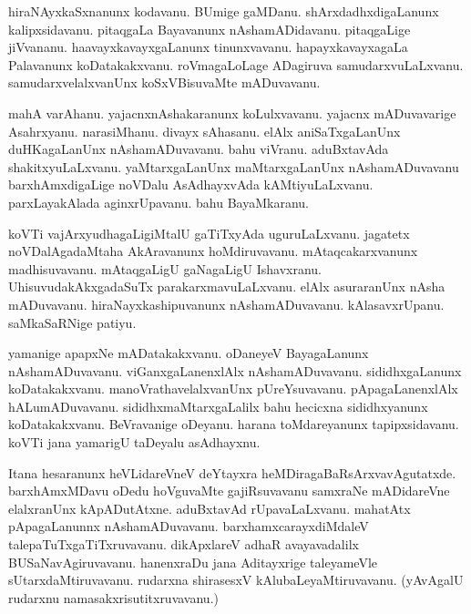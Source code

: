 \documentclass{article}
\begin{document}
\begin{mn}%
hiraNAyxkaSxnanunx kodavanu. BUmige gaMDanu. shArxdadhxdigaLanunx kalipxsidavanu. pitaqgaLa 
Bayavanunx nAshamADidavanu. pitaqgaLige jiVvananu. haavayxkavayxgaLanunx tinunxvavanu. 
hapayxkavayxagaLa Palavanunx koDatakakxvanu. roVmagaLoLage ADagiruva samudarxvuLaLxvanu. 
samudarxvelalxvanUnx koSxVBisuvaMte mADuvavanu.
\end{mn}

\begin{mn}%
mahA varAhanu. yajacnxnAshakaranunx koLulxvavanu. yajacnx mADuvavarige Asahrxyanu. narasiMhanu. 
divayx sAhasanu. elAlx aniSaTxgaLanUnx duHKagaLanUnx nAshamADuvavanu. bahu viVranu. aduBxtavAda 
shakitxyuLaLxvanu. yaMtarxgaLanUnx maMtarxgaLanUnx nAshamADuvavanu barxhAmxdigaLige noVDalu 
AsAdhayxvAda kAMtiyuLaLxvanu. parxLayakAlada aginxrUpavanu. bahu BayaMkaranu.
\end{mn}

\begin{mn}%
koVTi vajArxyudhagaLigiMtalU gaTiTxyAda uguruLaLxvanu. jagatetx noVDalAgadaMtaha AkAravanunx 
hoMdiruvavanu. mAtaqcakarxvanunx madhisuvavanu. mAtaqgaLigU gaNagaLigU Ishavxranu. 
UhisuvudakAkxgadaSuTx parakarxmavuLaLxvanu. elAlx asuraranUnx nAsha mADuvavanu. 
hiraNayxkashipuvanunx nAshamADuvavanu. kAlasavxrUpanu. saMkaSaRNige patiyu.
\end{mn}

\begin{mn}%
yamanige apapxNe mADatakakxvanu. oDaneyeV BayagaLanunx nAshamADuvavanu. viGanxgaLanenxlAlx 
nAshamADuvavanu. sididhxgaLanunx koDatakakxvanu. manoVrathavelalxvanUnx pUreYsuvavanu. 
pApagaLanenxlAlx hALumADuvavanu. sididhxmaMtarxgaLalilx bahu hecicxna sididhxyanunx koDatakakxvanu. 
BeVravanige oDeyanu. harana toMdareyanunx tapipxsidavanu. koVTi jana yamarigU 
taDeyalu asAdhayxnu.
\end{mn}

\begin{mn}%
Itana hesaranunx  heVLidareVneV deYtayxra heMDiragaBaRsArxvavAgutatxde. barxhAmxMDavu oDedu 
hoVguvaMte gajiRsuvavanu samxraNe mADidareVne elalxranUnx kApADutAtxne. aduBxtavAd rUpavaLaLxvanu. 
mahatAtx pApagaLanunnx nAshamADuvavanu. barxhamxcarayxdiMdaleV talepaTuTxgaTiTxruvavanu. 
dikApxlareV adhaR avayavadalilx BUSaNavAgiruvavanu. hanenxraDu jana Aditayxrige taleyameVle 
sUtarxdaMtiruvavanu. rudarxna shirasesxV kAlubaLeyaMtiruvavanu. (yAvAgalU rudarxnu 
namasakxrisutitxruvavanu.)
\end{mn}
\end{document}
